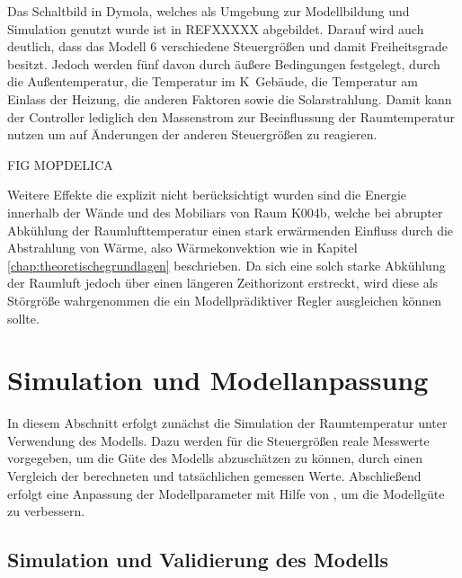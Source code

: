  Das Schaltbild in Dymola, welches als Umgebung zur Modellbildung und Simulation genutzt wurde ist in REFXXXXX abgebildet. Darauf wird auch deutlich, dass das Modell 6 verschiedene Steuergrößen und damit Freiheitsgrade besitzt. Jedoch werden fünf davon durch äußere Bedingungen festgelegt, durch die Außentemperatur, die Temperatur im K~Gebäude, die Temperatur am Einlass der Heizung, die anderen Faktoren sowie die Solarstrahlung. Damit kann der Controller lediglich den Massenstrom zur Beeinflussung der Raumtemperatur nutzen um auf Änderungen der anderen Steuergrößen zu reagieren. 

FIG MOPDELICA

Weitere Effekte die explizit nicht berücksichtigt wurden sind die Energie innerhalb der Wände und des Mobiliars von Raum K004b, welche bei abrupter Abkühlung der Raumlufttemperatur einen stark erwärmenden Einfluss durch die Abstrahlung von Wärme, also Wärmekonvektion wie in Kapitel \ref{chap:theoretischegrundlagen} beschrieben. Da sich eine solch starke Abkühlung der Raumluft jedoch über einen längeren Zeithorizont erstreckt, wird diese als Störgröße wahrgenommen die ein Modellprädiktiver Regler ausgleichen können sollte.


\section{Simulation und Modellanpassung}

In diesem Abschnitt erfolgt zunächst die Simulation der Raumtemperatur unter Verwendung des Modells. Dazu werden für die Steuergrößen reale Messwerte vorgegeben, um die Güte des Modells abzuschätzen zu können, durch einen Vergleich der berechneten und tatsächlichen gemessen Werte. Abschließend erfolgt eine Anpassung der Modellparameter mit Hilfe von \cite{casiopeia}, um die Modellgüte zu verbessern.

\subsection{Simulation und Validierung des Modells}

